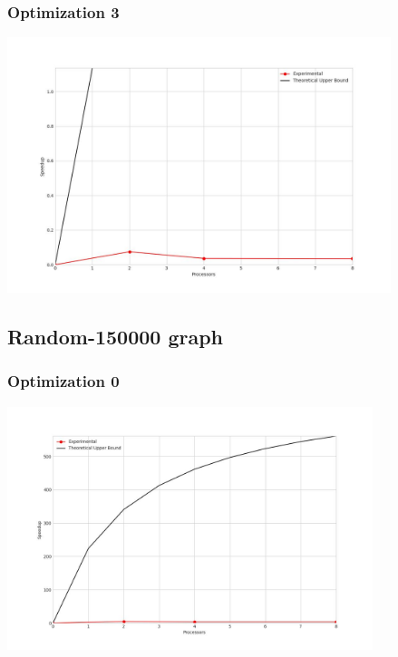 \subsubsection{Optimization 3}
\begin{center}
    \resizebox{0.95\textwidth}{!}{}
    \includegraphics[width=0.84\textwidth]{../img/speedup-graph_type-fully-disconnected-1000000-O3}
\end{center}

\clearpage
\subsection{Random-150000 graph}
\subsubsection{Optimization 0}
\begin{center}
    \resizebox{0.95\textwidth}{!}{}
    \includegraphics[width=0.8\textwidth]{../img/speedup-graph_type-random-150000-O0}
\end{center}



